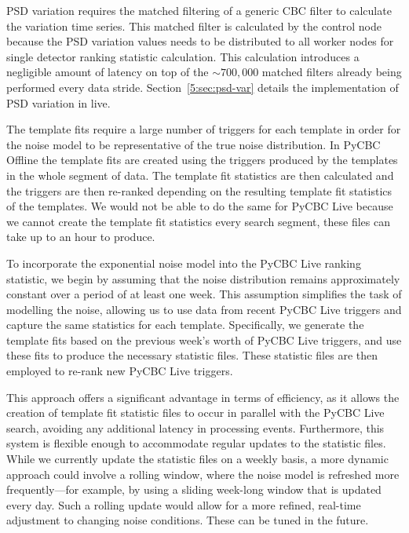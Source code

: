 
PSD variation requires the matched filtering of a generic CBC filter to calculate the variation time series. This matched filter is calculated by the control node because the PSD variation values needs to be distributed to all worker nodes for single detector ranking statistic calculation. This calculation introduces a negligible amount of latency on top of the ${\sim}700,000$ matched filters already being performed every data stride. Section~\ref{5:sec:psd-var} details the implementation of PSD variation in live.

The template fits require a large number of triggers for each template in order for the noise model to be representative of the true noise distribution. In PyCBC Offline the template fits are created using the triggers produced by the templates in the whole segment of data. The template fit statistics are then calculated and the triggers are then re-ranked depending on the resulting template fit statistics of the templates. We would not be able to do the same for PyCBC Live because we cannot create the template fit statistics every search segment, these files can take up to an hour to produce.


To incorporate the exponential noise model into the PyCBC Live ranking statistic, we begin by assuming that the noise distribution remains approximately constant over a period of at least one week. This assumption simplifies the task of modelling the noise, allowing us to use data from recent PyCBC Live triggers and capture the same statistics for each template. Specifically, we generate the template fits based on the previous week’s worth of PyCBC Live triggers, and use these fits to produce the necessary statistic files. These statistic files are then employed to re-rank new PyCBC Live triggers.

This approach offers a significant advantage in terms of efficiency, as it allows the creation of template fit statistic files to occur in parallel with the PyCBC Live search, avoiding any additional latency in processing \gwadj events. Furthermore, this system is flexible enough to accommodate regular updates to the statistic files. While we currently update the statistic files on a weekly basis, a more dynamic approach could involve a rolling window, where the noise model is refreshed more frequently---for example, by using a sliding week-long window that is updated every day. Such a rolling update would allow for a more refined, real-time adjustment to changing noise conditions. These can be tuned in the future.

